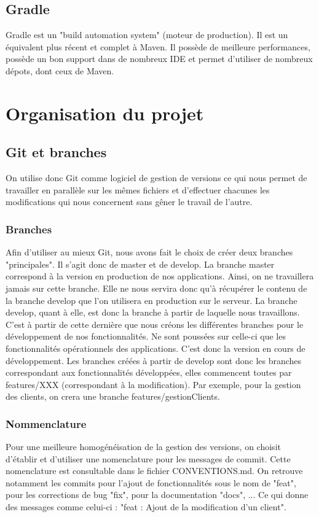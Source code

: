 		\subsection{Gradle}
			Gradle est un "build automation system" (moteur de production). Il est un équivalent plus récent et complet à Maven. Il possède de meilleure performances, possède un bon support dans de nombreux IDE et permet d'utiliser de nombreux dépots, dont ceux de Maven.

	\section{Organisation du projet}
		\subsection{Git et branches}
			On utilise donc Git comme logiciel de gestion de versions ce qui nous permet de travailler en parallèle sur les mêmes fichiers et d'effectuer chacunes les modifications qui nous concernent sans gêner le travail de l'autre.
			\subsubsection{Branches}
				Afin d'utiliser au mieux Git, nous avons fait le choix de créer deux branches "principales". Il s'agit donc de master et de develop.
				La branche master correspond à la version en production de nos applications. Ainsi, on ne travaillera jamais sur cette branche. Elle ne nous servira donc qu'à récupérer le contenu de la branche develop que l'on utilisera en production sur le serveur.
				La branche develop, quant à elle, est donc la branche à partir de laquelle nous travaillons. C'est à partir de cette dernière que nous créons les différentes branches pour le développement de nos fonctionnalités. Ne sont poussées sur celle-ci que les fonctionnalités opérationnels des applications. C'est donc la version en cours de développement.
				Les branches créées à partir de develop sont donc les branches correspondant aux fonctionnalités développées, elles commencent toutes par features/XXX (correspondant à la modification). Par exemple, pour la gestion des clients, on crera une branche features/gestionClients.

			\subsubsection{Nommenclature}
				Pour une meilleure homogénéisation de la gestion des versions, on choisit d'établir et d'utiliser une nomenclature pour les messages de commit. Cette nomenclature est consultable dans le fichier CONVENTIONS.md.
				On retrouve notamment les commits pour l'ajout de fonctionnalités sous le nom de "feat", pour les corrections de bug "fix", pour la documentation "docs", ...
				Ce qui donne des messages comme celui-ci : "feat : Ajout de la modification d'un client".


